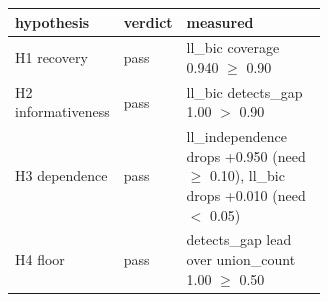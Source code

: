 \begin{tabular}{llp{0.62\linewidth}}
\toprule
hypothesis & verdict & measured \\
\midrule
H1 recovery & pass & ll\_bic coverage 0.940 $\geq$ 0.90 \\
H2 informativeness & pass & ll\_bic detects\_gap 1.00 $>$ 0.90 \\
H3 dependence & pass & ll\_independence drops +0.950 (need $\geq$ 0.10), ll\_bic drops +0.010 (need $<$ 0.05) \\
H4 floor & pass & detects\_gap lead over union\_count 1.00 $\geq$ 0.50 \\
\bottomrule
\end{tabular}
\par{}
